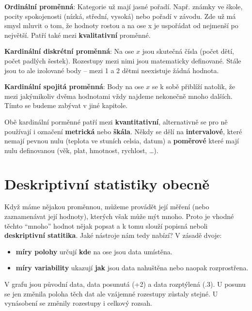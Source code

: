 \documentclass[
  czech,
  11pt,
  letterpaper,
  DIV=11,
  numbers=noendperiod]{scrreprt}
\providecommand{\tightlist}{%
  \setlength{\itemsep}{0pt}\setlength{\parskip}{0pt}}
\begin{document}
\textbf{Ordinální proměnná}: Kategorie už mají jasné pořadí. Např.
známky ve škole, pocity spokojenosti (nízká, střední, vysoká) nebo
pořadí v závodu. Zde už má smysl mluvit o tom, že hodnoty rostou a na
ose x je uspořádat od nejmenší po největší. Patří také mezi
\textbf{kvalitativní} proměnné.

\textbf{Kardinální diskrétní proměnná}: Na ose \(x\) jsou skutečná čísla
(počet dětí, počet padlých šestek). Rozestupy mezi nimi jsou matematicky
definované. Stále jsou to ale izolované body -- mezi 1 a 2 dětmi
neexistuje žádná hodnota.

\textbf{Kardinální spojitá proměnná}: Body na ose \(x\) se k sobě
přiblíží natolik, že mezi jakýmikoliv dvěma hodnotami vždy najdeme
nekonečně mnoho dalších. Tímto se budeme zabývat v jiné kapitole.

Obě kardinální porměnné patří mezi \textbf{kvantitativní}, alternativně
se pro ně používají i označení \textbf{metrická} nebo \textbf{škála}.
Někdy se dělí na \textbf{intervalové}, které nemají pevnou nulu (teplota
ve stuních celsia, datum) a \textbf{poměrové} které mají nulu
definovanou (věk, plat, hmotnost, rychlost, \ldots).

\section{Deskriptivní statistiky
obecně}\label{deskriptivnuxed-statistiky-obecnux11b}

Když máme nějakou proměnnou, můžeme provádět její měření (nebo
zaznamenávat její hodnoty), kterých však může mýt mnoho. Proto je vhodné
těchto ``mnoho'' hodnot nějak popsat a k tomu slouží popisná neboli
\textbf{deskriptivní statitika}. Jaké nástroje nám tedy nabízí? V zásadě
dvoje:

\begin{itemize}
\tightlist
\item
  \textbf{míry polohy} určují \textbf{kde} na ose jsou data umístěna.
\item
  \textbf{míry variability} ukazují \textbf{jak} jsou data nahuštěna
  nebo naopak rozprostřena.
\end{itemize}

V grafu jsou původní data, data posunutá (+2) a data rozptýlená (.3). U
posunu se jen změnila poloha těch dat ale vzájemné rozestupy zůstaly
stejné. U vynásobení se změnily rozestupy i celkový rozsah.
\end{document}
